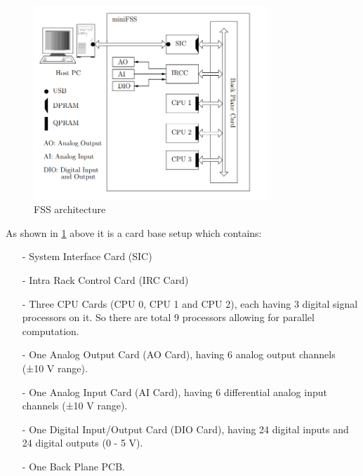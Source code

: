 \begin{figure}[th]
\centering
\includegraphics[width=250pt]{fig/fss_arch2.png}
\caption{FSS architecture}
\label{fig:fss_arch}
\end{figure}
As shown in \ref{fig:fss_arch} above it is a card base setup which contains:



\begin{itemize}
\item[-] System Interface Card (SIC)
\item[-] Intra Rack Control Card (IRC Card)
\item[-] Three CPU Cards (CPU 0, CPU 1 and CPU 2), each having 3 digital signal processors on it. So there are total 9 processors allowing for parallel computation.
\item[-] One Analog Output Card (AO Card), having 6 analog output channels (±10 V range).
\item[-]One Analog Input Card (AI Card), having 6 differential analog input channels (±10 V range).
\item[-] One Digital Input/Output Card (DIO Card), having 24 digital inputs and 24 digital outputs (0 - 5 V).
\item[-] One Back Plane PCB.
\end{itemize}

